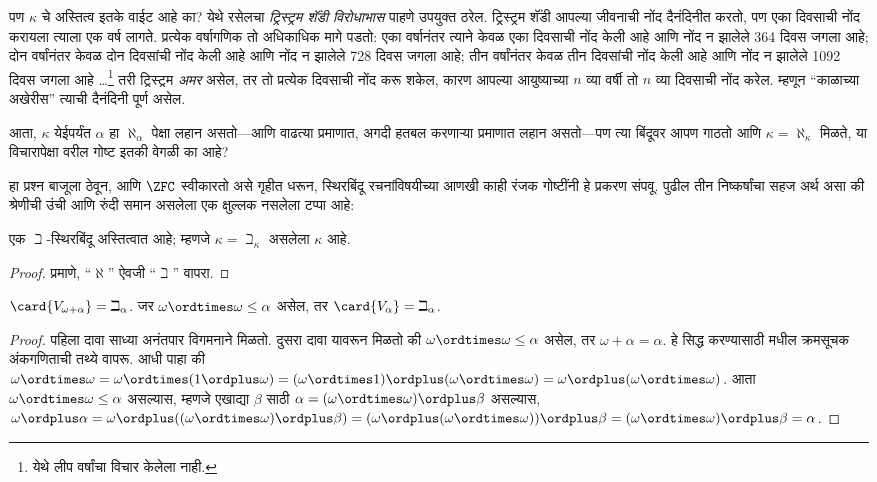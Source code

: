 \documentclass[../../../include/open-logic-section]{subfiles}
\begin{document}
पण $\kappa$ चे अस्तित्व इतके वाईट आहे का? येथे रसेलचा \emph{ट्रिस्ट्रम शॅंडी विरोधाभास} पाहणे उपयुक्त ठरेल. ट्रिस्ट्रम शॅंडी आपल्या जीवनाची नोंद दैनंदिनीत करतो, पण एका दिवसाची नोंद करायला त्याला एक वर्ष लागते. प्रत्येक वर्षागणिक तो अधिकाधिक मागे पडतो: एका वर्षानंतर त्याने केवळ एका दिवसाची नोंद केली आहे आणि नोंद न झालेले 364 दिवस जगला आहे; दोन वर्षांनंतर केवळ दोन दिवसांची नोंद केली आहे आणि नोंद न झालेले 728 दिवस जगला आहे; तीन वर्षांनंतर केवळ तीन दिवसांची नोंद केली आहे आणि नोंद न झालेले 1092 दिवस जगला आहे \dots\footnote{येथे लीप वर्षांचा विचार केलेला नाही.} तरी ट्रिस्ट्रम \emph{अमर} असेल, तर तो प्रत्येक दिवसाची नोंद करू शकेल, कारण आपल्या आयुष्याच्या $n$ व्या वर्षी तो $n$ व्या दिवसाची नोंद करेल. म्हणून “काळाच्या अखेरीस” त्याची दैनंदिनी पूर्ण असेल.

आता, $\kappa$ येईपर्यंत $\alpha$ हा $\aleph_\alpha$ पेक्षा लहान असतो---आणि वाढत्या प्रमाणात, अगदी हतबल करणाऱ्या प्रमाणात लहान असतो---पण त्या बिंदूवर आपण गाठतो आणि $\kappa
= \aleph_\kappa$ मिळते, या विचारापेक्षा वरील गोष्ट इतकी वेगळी का आहे?

हा प्रश्न बाजूला ठेवून, आणि $\ZFC$ स्वीकारतो असे गृहीत धरून, स्थिरबिंदू रचनांविषयीच्या आणखी काही रंजक गोष्टींनी हे प्रकरण संपवू. पुढील तीन निष्कर्षांचा सहज अर्थ असा की श्रेणीची उंची आणि रुंदी समान असलेला एक क्षुल्लक नसलेला टप्पा आहे:

\begin{prop}
एक $\beth$-स्थिरबिंदू अस्तित्वात आहे; म्हणजे $\kappa=
\beth_\kappa$ असलेला $\kappa$ आहे.
\end{prop}

\begin{proof}
 प्रमाणे, “$\aleph$” ऐवजी “$\beth$” वापरा.
\end{proof}

\begin{prop}
$\card{V_{\omega+\alpha}} = \beth_{\alpha}$. जर $\omega \ordtimes
\omega \leq \alpha$ असेल, तर $\card{V_\alpha} = \beth_\alpha$.
\end{prop}

\begin{proof}
पहिला दावा साध्या अनंतपार विगमनाने मिळतो. दुसरा दावा यावरून मिळतो की $\omega \ordtimes \omega \leq \alpha$ असेल, तर $\omega + \alpha = \alpha$. हे सिद्ध करण्यासाठी  मधील क्रमसूचक अंकगणिताची तथ्ये वापरू. आधी पाहा की $\omega \ordtimes \omega = \omega \ordtimes (1 \ordplus \omega) =
(\omega \ordtimes 1) \ordplus (\omega\ordtimes\omega) = \omega
\ordplus (\omega \ordtimes \omega)$. आता $\omega \ordtimes \omega
\leq \alpha$ असल्यास, म्हणजे एखाद्या $\beta$ साठी $\alpha = (\omega\ordtimes\omega) \ordplus \beta$ असल्यास, $\omega \ordplus \alpha = \omega \ordplus
((\omega \ordtimes \omega) \ordplus \beta) = (\omega \ordplus (\omega
\ordtimes \omega)) \ordplus \beta = (\omega \ordtimes \omega) \ordplus
\beta = \alpha$.
\end{proof}
\end{document}
